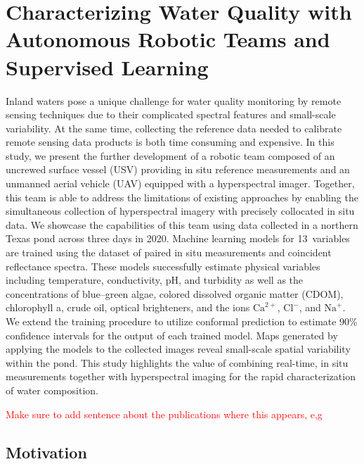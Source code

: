 \chapter{Characterizing Water Quality with Autonomous Robotic Teams and Supervised Learning}\label{ch:robot-team-supervised}


Inland waters pose a unique challenge for water quality monitoring by remote
sensing techniques due to their complicated spectral features and
small-scale variability. At the same time, collecting the reference data
needed to calibrate remote sensing data products is both time consuming and
expensive. In this study, we present the further development of a robotic
team composed of an uncrewed surface vessel (USV) providing in situ
reference measurements and an unmanned aerial vehicle (UAV) equipped with a
hyperspectral imager. Together, this team is able to address the limitations
of existing approaches by enabling the simultaneous collection of
hyperspectral imagery with precisely collocated in situ data. We showcase
the capabilities of this team using data collected in a northern Texas pond
across three days in 2020. Machine learning models for 13~variables are
trained using the dataset of paired in situ measurements and coincident
reflectance spectra. These models successfully estimate physical variables
including temperature, conductivity, pH, and turbidity as well as the
concentrations of blue--green algae, colored dissolved organic matter
(CDOM), chlorophyll a, crude oil, optical brighteners, and the ions
$\mathrm{Ca}^{2+}$, $\mathrm{Cl}^{-}$, and $\mathrm{Na}^{+}$. We extend the
training procedure to utilize conformal prediction to estimate 90\%
confidence intervals for the output of each trained model. Maps generated by
applying the models to the collected images reveal small-scale spatial
variability within the pond. This study highlights the value of combining
real-time, in situ measurements together with hyperspectral imaging for the
rapid characterization of water composition.


\textcolor{red}{
  Make sure to add sentence about the publications where this appears, e,g
  \cite{robot-team-1, robot-team-2}
}

\section{Motivation}


